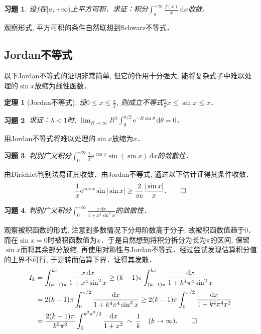 \documentclass[11pt,a4paper]{ctexart}
\makeatletter
\theoremstyle{thmseries} %
\newtheorem{thm}{定理}[section]
\theoremstyle{exerseries}
\newtheorem{exer}{习题}[section]
\renewenvironment{proof}[1][\proofname]{\par
  \pushQED{\qed}%
  \normalfont \topsep6\p@\@plus6\p@\relax
  \trivlist
  \item[\hskip\labelsep
        \itshape
    #1\@addpunct{}]\ignorespaces
}{%
  \popQED\endtrivlist\@endpefalse
}
\newenvironment{sol}{\begin{proof}[\bfseries\upshape 解\quad]}{\end{proof}}
\newenvironment{pf}{\begin{proof}[\bfseries\upshape 证\quad]}{\end{proof}}
\renewcommand{\d}{\mathrm{d}}
\newcommand{\e}{\mathrm{e}}
\makeatother
\begin{document}
\begin{exer}
	设$f$在$[a,+\infty)$上平方可积．求证：积分$\int_{a}^{+\infty}\frac{f(x)}{x}\,\d x$收敛．
\end{exer}
\begin{pf}
	观察形式, 平方可积的条件自然联想到Schwarz不等式．
\end{pf}


\subsection{Jordan不等式}
以下Jordan不等式的证明非常简单, 但它的作用十分强大, 能将复杂式子中难以处理的$\sin x$放缩为线性函数．
\begin{thm}[Jordan不等式]
	设$0\leq x\leq\frac{\pi}{2}$, 则成立不等式$\frac{2}{\pi}x\leq\sin x\leq x$．
\end{thm}

\begin{exer}
	求证：$\lambda<1$时, $\lim_{R\to\infty}R^\lambda\int_{0}^{\pi/2}\e^{-R\sin\theta}\,\d\theta=0$．
\end{exer}
\begin{pf}
	用Jordan不等式将难以处理的$\sin x$放缩为$x$．
\end{pf}

\begin{exer}
	判别广义积分$\int_{0}^{+\infty}\frac{1}{x}\e^{\cos x}\sin(\sin x)\,\d x$的敛散性．
\end{exer}
\begin{sol}
	由Dirichlet判别法易证其收敛．由Jordan不等式, 通过以下估计证得其条件收敛．
	\[\frac{1}{x}\e^{\cos x}\sin|\sin x|\geq\frac{2}{\pi\e}\frac{|\sin x|}{x}.\qedhere\]
\end{sol}

\begin{exer}
	判别广义积分$\int_{0}^{+\infty}\frac{x\,\d x}{1+x^4\sin^2x}$的敛散性．
\end{exer}
\begin{sol}
	观察被积函数的形式, 注意到多数情况下分母阶数高于分子, 故被积函数值趋于$0$．而在$\sin x=0$时被积函数值为$x$．于是自然想到将积分拆分为长为$\pi$的区间, 保留$\sin x$而将其余部分放缩, 再使用对称性与Jordan不等式．经过尝试发现估算积分值的上界不可行, 于是转而估算下界．证得其发散．
	\begin{align*}
		I_k&=\int_{(k-1)\pi}^{k\pi}\frac{x\,\d x}{1+x^4\sin^2x}\geq(k-1)\pi\int_{(k-1)\pi}^{k\pi}\frac{\d x}{1+k^4\pi^4\sin^2x}\\
		&=2(k-1)\pi\int_{0}^{\pi/2}\frac{\d x}{1+k^4\pi^4\sin^2x}\geq2(k-1)\pi\int_{0}^{\pi/2}\frac{\d x}{1+k^4\pi^4x^2}\\
		&=\frac{2(k-1)\pi}{k^2\pi^2}\int_{0}^{k^2\pi^3/2}\frac{\d x}{1+x^2}\,\sim\,\frac{1}{k}\quad(k\to\infty).\qedhere
	\end{align*}
\end{sol}
\end{document}
